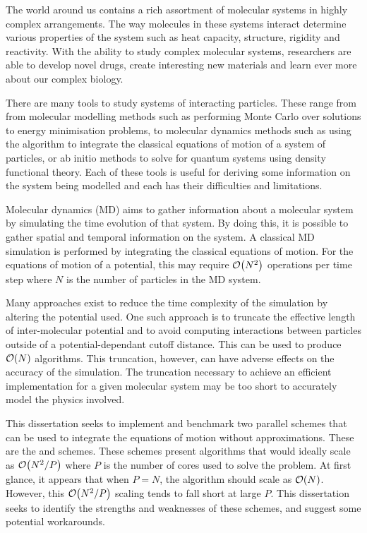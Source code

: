 %
%

%
The world around us contains
a rich assortment of molecular systems in
highly complex arrangements.
%
The way molecules in these systems interact determine various properties
of the system such as heat capacity, structure, rigidity and reactivity.
%
With the ability to study complex molecular systems,
researchers are able to develop novel drugs,
create interesting new materials and
learn ever more about our complex biology.

%
There are many tools to study systems of interacting particles.
These range from from molecular modelling methods such as performing
Monte Carlo over solutions to energy minimisation problems,
to molecular dynamics methods such as using the \velocityverlet{}
algorithm to integrate the classical equations of motion of a
system of particles, or ab initio methods to solve for quantum systems
using density functional theory.
%
Each of these tools is useful for
deriving some information on the system being modelled and
each has their difficulties and limitations.


%
Molecular dynamics (MD) aims to
gather information about a molecular system by
simulating the time evolution of that system.
%
By doing this, it is possible to
gather spatial and temporal information on the system.
%
A classical MD simulation is performed by integrating
the classical equations of motion.
%
For the equations of motion of a \twobody{} potential,
this may require $\mathcal{O}{\left({ N^2 }\right)}$ operations per time step
where $N$ is the number of particles in the MD system.


Many approaches exist to reduce the time complexity of
the simulation by altering the potential used.
%
One such approach is to truncate the effective length of inter-molecular
potential and to avoid computing interactions between particles outside of a
potential-dependant cutoff distance.
%
This can be used to produce $\mathcal{O}{\left({ N }\right)}$ algorithms.
%
This truncation, however, can have adverse effects on the accuracy
of the simulation.
%
The truncation necessary to achieve an efficient implementation
for a given molecular system may be
too short to accurately model the physics involved.

%
This dissertation seeks to implement and benchmark two parallel schemes
that can be used to integrate the equations of motion without
approximations.
%
These are the \replicateddata{} and \systolicloop{} schemes.
%
These schemes present algorithms that would ideally scale as $\mathcal{O}{\left({ N^2/P }\right)}$
where $P$ is the number of cores used to solve the problem.
%
At first glance, it appears that when $P = N$, the algorithm should
scale as $\mathcal{O}{\left({ N }\right)}$.
%
However, this $\mathcal{O}{\left({ N^2/P }\right)}$ scaling tends to fall short at large $P$.
%
This dissertation seeks to identify the strengths and weaknesses of
these schemes, and suggest some potential workarounds.


